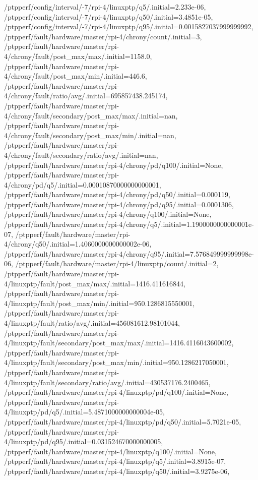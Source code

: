 {    /ptpperf/config/interval/-7/rpi-4/linuxptp/q5/.initial=2.233e-06,
    /ptpperf/config/interval/-7/rpi-4/linuxptp/q50/.initial=3.4851e-05,
    /ptpperf/config/interval/-7/rpi-4/linuxptp/q95/.initial=0.0015827037999999992,
    /ptpperf/fault/hardware/master/rpi-4/chrony/count/.initial=3,
    /ptpperf/fault/hardware/master/rpi-4/chrony/fault/post_max/max/.initial=1158.0,
    /ptpperf/fault/hardware/master/rpi-4/chrony/fault/post_max/min/.initial=446.6,
    /ptpperf/fault/hardware/master/rpi-4/chrony/fault/ratio/avg/.initial=695857438.245174,
    /ptpperf/fault/hardware/master/rpi-4/chrony/fault/secondary/post_max/max/.initial=nan,
    /ptpperf/fault/hardware/master/rpi-4/chrony/fault/secondary/post_max/min/.initial=nan,
    /ptpperf/fault/hardware/master/rpi-4/chrony/fault/secondary/ratio/avg/.initial=nan,
    /ptpperf/fault/hardware/master/rpi-4/chrony/pd/q100/.initial=None,
    /ptpperf/fault/hardware/master/rpi-4/chrony/pd/q5/.initial=0.00010870000000000001,
    /ptpperf/fault/hardware/master/rpi-4/chrony/pd/q50/.initial=0.000119,
    /ptpperf/fault/hardware/master/rpi-4/chrony/pd/q95/.initial=0.0001306,
    /ptpperf/fault/hardware/master/rpi-4/chrony/q100/.initial=None,
    /ptpperf/fault/hardware/master/rpi-4/chrony/q5/.initial=1.1900000000000001e-07,
    /ptpperf/fault/hardware/master/rpi-4/chrony/q50/.initial=1.4060000000000002e-06,
    /ptpperf/fault/hardware/master/rpi-4/chrony/q95/.initial=7.576849999999998e-06,
    /ptpperf/fault/hardware/master/rpi-4/linuxptp/count/.initial=2,
    /ptpperf/fault/hardware/master/rpi-4/linuxptp/fault/post_max/max/.initial=1416.411616844,
    /ptpperf/fault/hardware/master/rpi-4/linuxptp/fault/post_max/min/.initial=950.1286815550001,
    /ptpperf/fault/hardware/master/rpi-4/linuxptp/fault/ratio/avg/.initial=456081612.98101044,
    /ptpperf/fault/hardware/master/rpi-4/linuxptp/fault/secondary/post_max/max/.initial=1416.4116043600002,
    /ptpperf/fault/hardware/master/rpi-4/linuxptp/fault/secondary/post_max/min/.initial=950.1286217050001,
    /ptpperf/fault/hardware/master/rpi-4/linuxptp/fault/secondary/ratio/avg/.initial=430537176.2400465,
    /ptpperf/fault/hardware/master/rpi-4/linuxptp/pd/q100/.initial=None,
    /ptpperf/fault/hardware/master/rpi-4/linuxptp/pd/q5/.initial=5.4871000000000004e-05,
    /ptpperf/fault/hardware/master/rpi-4/linuxptp/pd/q50/.initial=5.7021e-05,
    /ptpperf/fault/hardware/master/rpi-4/linuxptp/pd/q95/.initial=0.031524670000000005,
    /ptpperf/fault/hardware/master/rpi-4/linuxptp/q100/.initial=None,
    /ptpperf/fault/hardware/master/rpi-4/linuxptp/q5/.initial=3.8915e-07,
    /ptpperf/fault/hardware/master/rpi-4/linuxptp/q50/.initial=3.9275e-06,
}
